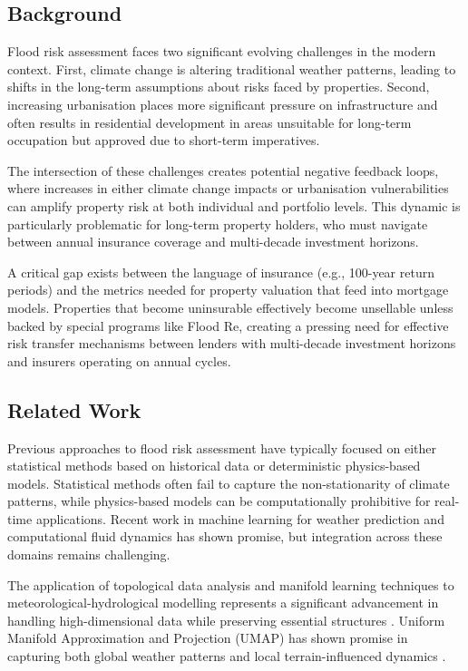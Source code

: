 \documentclass{article}
\begin{document}
\subsection{Background}
Flood risk assessment faces two significant evolving challenges in the modern context. First, climate change is altering traditional weather patterns, leading to shifts in the long-term assumptions about risks faced by properties. Second, increasing urbanisation places more significant pressure on infrastructure and often results in residential development in areas unsuitable for long-term occupation but approved due to short-term imperatives.

The intersection of these challenges creates potential negative feedback loops, where increases in either climate change impacts or urbanisation vulnerabilities can amplify property risk at both individual and portfolio levels. This dynamic is particularly problematic for long-term property holders, who must navigate between annual insurance coverage and multi-decade investment horizons.

A critical gap exists between the language of insurance (e.g., 100-year return periods) and the metrics needed for property valuation that feed into mortgage models. Properties that become uninsurable effectively become unsellable unless backed by special programs like Flood Re, creating a pressing need for effective risk transfer mechanisms between lenders with multi-decade investment horizons and insurers operating on annual cycles.

\subsection{Related Work}
Previous approaches to flood risk assessment have typically focused on either statistical methods based on historical data or deterministic physics-based models. Statistical methods often fail to capture the non-stationarity of climate patterns, while physics-based models can be computationally prohibitive for real-time applications. Recent work in machine learning for weather prediction \cite{racah2017} and computational fluid dynamics \cite{bates2010} has shown promise, but integration across these domains remains challenging.

The application of topological data analysis and manifold learning techniques to meteorological-hydrological modelling represents a significant advancement in handling high-dimensional data while preserving essential structures \cite{lakshmanan2023}.  Uniform Manifold Approximation and Projection (UMAP) has shown promise in capturing both global weather patterns and local terrain-influenced dynamics \cite{mcinnes2018}.
\end{document}
